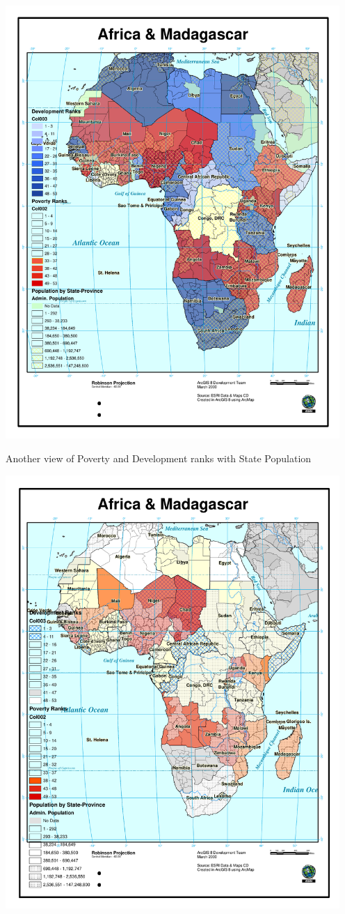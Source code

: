 \includegraphics[width=5in]{Images/GIS/PovertyFeatureMapV4_PovertyDevelopment_StatePopulation.pdf}

\newpage

Another view of Poverty and Development ranks with State
Population

\includegraphics[width=5in]{Images/GIS/PovertyFeatureMapV9_PovertyDev_StatePop.pdf}

